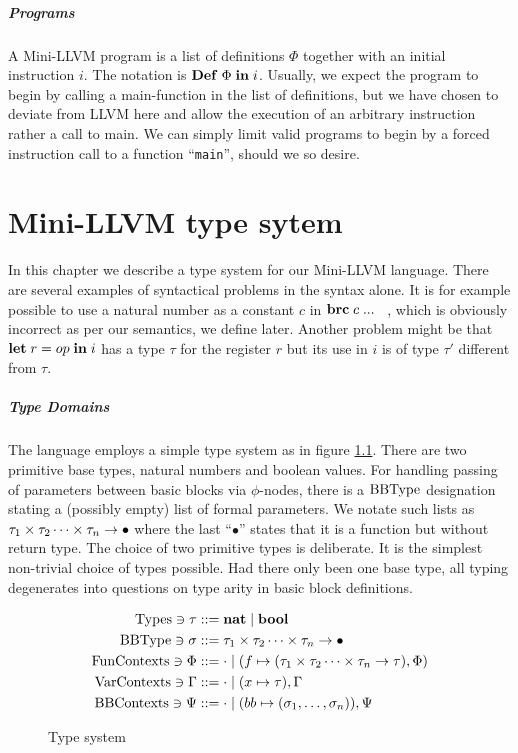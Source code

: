 \documentclass[a4paper, oneside, 10pt, draft]{memoir}
\begin{document}
\paragraph{Programs}

A Mini-LLVM program is a list of definitions $\Phi$ together with an
initial instruction $i$. The notation is $\mathbf{Def} \; \Phi \; \mathbf{in} \; i$. Usually, we
expect the program to begin by calling a main-function in the list of
definitions, but we have chosen to deviate from LLVM here and allow
the execution of an arbitrary instruction rather a call to main. We
can simply limit valid programs to begin by a forced instruction
call to a function ``\texttt{main}'', should we so desire.

\chapter{Mini-LLVM type sytem}
\label{chap:type-system}

In this chapter we describe a type system for our Mini-LLVM
language. There are several examples of syntactical problems in the
syntax alone. It is for example possible to use a natural number as a
constant $c$ in $\mathbf{brc} \; c \; ... \;  \;  \;$, which is obviously incorrect as
per our semantics, we define later. Another problem might be that
$\mathbf{let} \; r = op \; \mathbf{in} \; i$ has a type $\tau$ for the register $r$ but its use
in $i$ is of type $\tau'$ different from $\tau$.

\paragraph{Type Domains} The language employs a simple type system as in
figure \ref{fig:type-system}. There are two primitive base types,
natural numbers and boolean values. For handling passing of parameters
between basic blocks via $\phi$-nodes, there is a $\mathrm{BB Type}$
designation stating a (possibly empty) list of formal parameters. We
notate such lists as $\tau_1 \times \tau_2 \dotsb \times \tau_n -> \bullet$ where the last
``$\bullet$'' states that it is a function but without return type.
The choice of two primitive types is deliberate. It is the simplest
non-trivial choice of types possible. Had there only been one base
type, all typing degenerates into questions on type arity in basic
block definitions.

\begin{figure}
  \begin{align*}
    \mathrm{Types} \ni \tau & ::= \mathbf{nat} \; \vert \; \mathbf{bool} \\
    \mathrm{BB Type} \ni \sigma   & ::= \tau_1 \times \tau_2 \dotsb \times \tau_n -> \bullet\\
    \mathrm{Fun Contexts} \ni \Phi & ::= \cdot \; \vert \; (f \mapsto (\tau_1 \times \tau_2 \dotsb \times \tau_n -> \tau), \Phi) \\
    \mathrm{Var Contexts} \ni \Gamma & ::= \cdot \; \vert \; (x \mapsto \tau),\Gamma\\
    \mathrm{BB Contexts} \ni \Psi   & ::= \cdot \; \vert \; (bb \mapsto (\sigma_1, \dotsc, \sigma_n)),\Psi
  \end{align*}
  \caption{Type system}
  \label{fig:type-system}
\end{figure}
\end{document}
